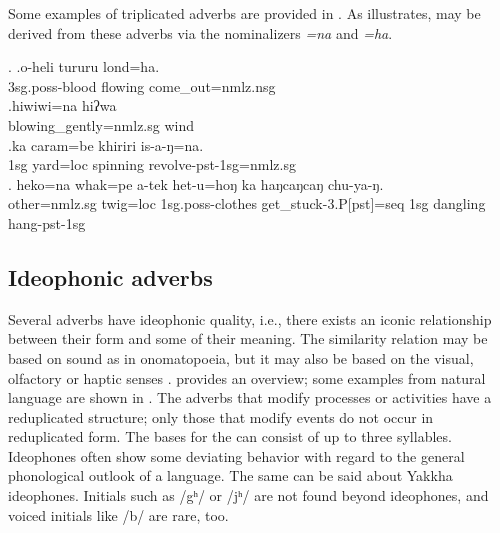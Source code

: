 Some examples of triplicated adverbs are provided in \Next. As \Next[b] illustrates,  may be derived from these adverbs via the nominalizers \emph{=na} and \emph{=ha}.  

 \ex. \ag.o-heli tururu lond=ha.\\	
	{\sc 3sg.poss}-blood flowing	come\_out{\sc [pst]=nmlz.nsg}	\\
	 \bg.hiwiwi=na hiʔwa\\
	blowing\_gently{\sc =nmlz.sg}	wind\\
	 \bg.ka caram=be khiriri is-a-ŋ=na.\\
		{\sc 1sg}	yard{\sc =loc} spinning 	revolve{\sc -pst-1sg=nmlz.sg}\\
	 \bg. heko=na         whak=pe      a-tek              het-u=hoŋ              ka  haŋcaŋcaŋ chu-ya-ŋ.\\
	other{\sc =nmlz.sg} twig{\sc =loc} {\sc 1sg.poss-}clothes get\_stuck{\sc -3.P[pst]=seq} {\sc 1sg} dangling hang{\sc -pst-1sg}\\
	  
	
\subsection{Ideophonic adverbs}\label{sec-ideophone}

Several adverbs have ideophonic quality, i.e., there exists an iconic relationship between their form and some  of their meaning. The similarity relation may be based on sound as in onomatopoeia, but it may also be based on the visual, olfactory or haptic senses \citep{Caughley1997_Vowel}.  provides an overview; some examples from natural language are shown in  \Next. The adverbs that modify processes or activities have a reduplicated structure; only those that modify  events do not occur in reduplicated form. The bases for the  can consist of up to three syllables. Ideophones often show some deviating behavior with regard to the general phonological outlook of a language. The same can be said about Yakkha ideophones. Initials such as /gʰ/ or /jʰ/ are not found beyond ideophones, and voiced initials like /b/ are rare, too.


